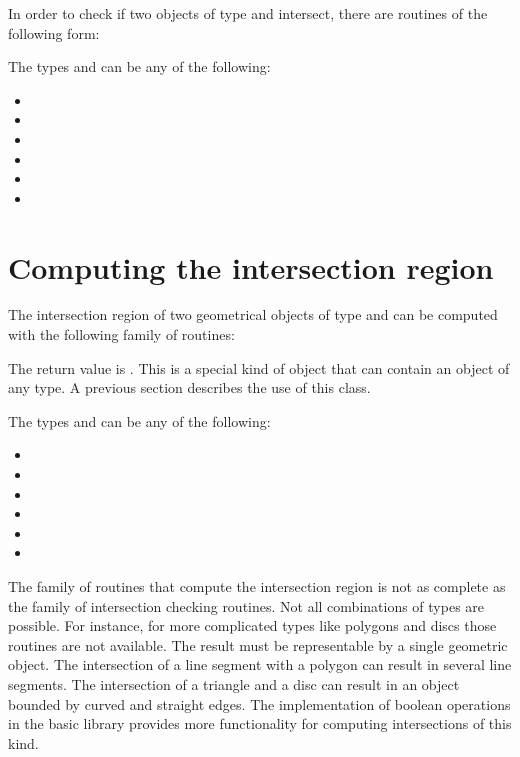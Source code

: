 In order to check if two objects of type  and 
intersect, there are routines of the following form:



The types  and  can be any of the
following:
\begin{itemize}
\item {}
\item {}
\item {}
\item {}
\item {}
\item {}
\end{itemize}



\section{Computing the intersection region}


The intersection region of two geometrical objects of type 
and  can be computed with the following family of routines:


The return value is . This is a special kind of object
that can contain an object of any type.
A previous section
describes the use of this class.

The types  and  can be any of the
following:
\begin{itemize}
\item {}
\item {}
\item {}
\item {}
\item {}
\item {}
\end{itemize}

The family of routines that compute the intersection region is not as complete
as the family of intersection checking routines.
Not all combinations of types are possible.
For instance, for more complicated types like polygons and discs those
routines are not available.
The result must be representable by a single geometric object.
The intersection of a line segment with a polygon can result in
several line segments. The intersection of a triangle and a disc can
result in an object bounded by curved and straight edges.  The
implementation of boolean operations in the basic library provides more
functionality for computing intersections of this kind.


